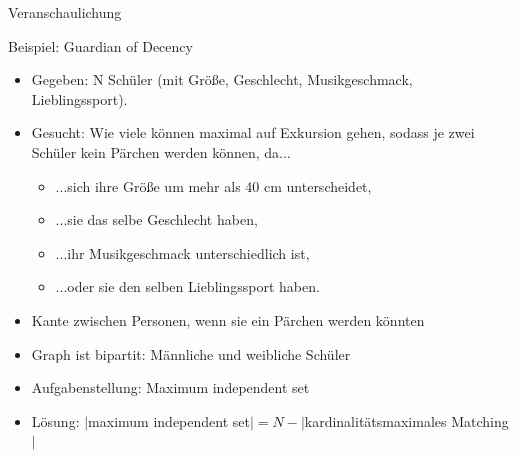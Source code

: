 \documentclass[18pt]{beamer}
\begin{document}
\begin{frame}{Veranschaulichung}
\begin{center}
\end{center}
\end{frame}

\begin{frame}{Beispiel: Guardian of Decency}
\begin{itemize}
\item Gegeben: N Sch\"uler (mit Gr\"o{\ss}e, Geschlecht, Musikgeschmack, Lieblingssport).
\item Gesucht: Wie viele k\"onnen maximal auf Exkursion gehen, sodass je zwei Sch\"uler kein P\"archen werden k\"onnen, da...
\begin{itemize}
	\item ...sich ihre Gr\"o{\ss}e um mehr als 40 cm unterscheidet,
	\item ...sie das selbe Geschlecht haben,
	\item ...ihr Musikgeschmack unterschiedlich ist,
	\item ...oder sie den selben Lieblingssport haben.
\end{itemize}

\pause

\item Kante zwischen Personen, wenn sie ein P\"archen werden k\"onnten
\item Graph ist bipartit: M\"annliche und weibliche Sch\"uler
\pause
\item Aufgabenstellung: Maximum independent set
\item L\"osung: $|$maximum independent set$| = N - |$kardinalit\"atsmaximales Matching$|$
\end{itemize}
\end{frame}
\end{document}
